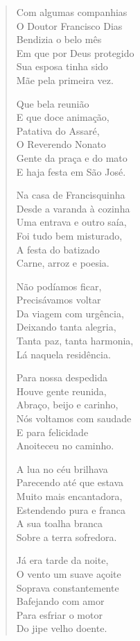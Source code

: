 \begin{verse}
Com algumas companhias\\
O Doutor Francisco Dias\\
Bendizia o belo mês\\
Em que por Deus protegido\\
Sua esposa tinha sido\\
Mãe pela primeira vez.

Que bela reunião\\
E que doce animação,\\
Patativa do Assaré,\\
O Reverendo Nonato\\
Gente da praça e do mato\\
E haja festa em São José.

Na casa de Francisquinha\\
Desde a varanda à cozinha\\
Uma entrava e outro saía,\\
Foi tudo bem misturado,\\
A festa do batizado\\
Carne, arroz e poesia.

Não podíamos ficar,\\
Precisávamos voltar\\
Da viagem com urgência,\\
Deixando tanta alegria,\\
Tanta paz, tanta harmonia,\\
Lá naquela residência.

Para nossa despedida\\
Houve gente reunida,\\
Abraço, beijo e carinho,\\
Nós voltamos com saudade\\
E para felicidade\\
Anoiteceu no caminho.

A lua no céu brilhava\\
Parecendo até que estava\\
Muito mais encantadora,\\
Estendendo pura e franca\\
A sua toalha branca\\
Sobre a terra sofredora.

Já era tarde da noite,\\
O vento um suave açoite\\
Soprava constantemente\\
Bafejando com amor\\
Para esfriar o motor\\
Do jipe velho doente.


\end{verse}
